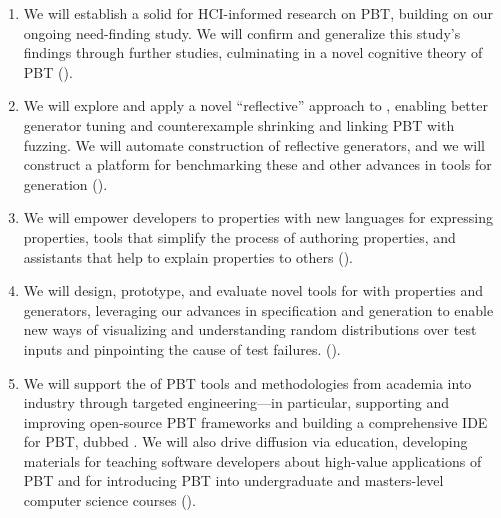 \begin{enumerate}[noitemsep]
\item We will establish a solid  for HCI-informed research on PBT,
building on our ongoing need-finding study. We will confirm and generalize
this study's findings through further studies, culminating in a novel
cognitive theory of PBT ().
%
\item We will explore and apply a novel ``reflective'' approach to
, enabling better generator tuning and counterexample
shrinking and linking PBT with fuzzing.  We will automate construction
of reflective generators, and we will construct a platform for
benchmarking these and other advances in tools for generation ().

%
\item We will empower developers to  properties with new
languages for expressing properties, tools that simplify the process of authoring
properties, and assistants that help to explain properties to others
().
%
\item We will design, prototype, and evaluate novel tools for
 with properties
and generators, leveraging our advances in specification and generation to
enable new ways of visualizing and understanding random distributions
over test inputs and pinpointing the cause of test failures.
().
%
\item We will support the  of PBT tools and
methodologies from academia into industry through targeted
engineering---in particular, supporting and
improving open-source PBT frameworks and building a comprehensive IDE
for PBT, dubbed \tyche.
We will also drive diffusion via education, developing materials for teaching
software developers about high-value applications of PBT and
for introducing PBT into undergraduate and masters-level computer science courses
().
\end{enumerate}
